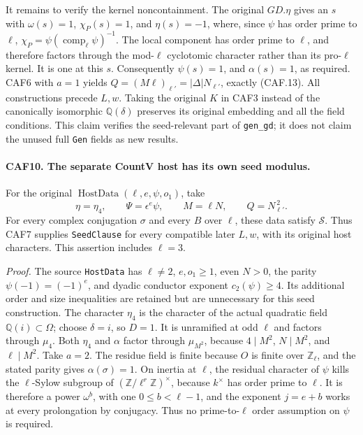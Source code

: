 It remains to verify the kernel noncontainment.  The original
\(GD.\eta\) gives an \(s\) with \(\omega(s)=1\),
\(\chi_P(s)=1\), and \(\eta(s)=-1\), where, since \(\psi\)
has order prime to \(\ell\),
\(\chi_P=\psi(\operatorname{comp}_\ell\psi)^{-1}\).
The local component has order prime to \(\ell\), and therefore
factors through the mod-\(\ell\) cyclotomic character rather than
its pro-\(\ell\) kernel.  It is one at this \(s\).
Consequently \(\psi(s)=1\), and \(\alpha(s)=1\), as required.
CAF6 with \(a=1\) yields
\(Q=(M\ell)_{\ell'}=|\Delta|N_{\ell'}\), exactly (CAF.13).
All constructions precede \(L,w\).  Taking the original \(K\)
in CAF3 instead of the canonically isomorphic \(\mathbb Q(\delta)\)
preserves its original embedding and all the field conditions.
This claim verifies the seed-relevant part of \texttt{gen\_gd}; it
does not claim the unused full \texttt{Gen} fields as new results.

\paragraph{CAF10. The separate CountV host has its own seed modulus.}
\label{claim:CAF10}
For the original \(\operatorname{HostData}(\ell,e,\psi,o_1)\),
take
\[
 \eta=\eta_4,\qquad \Psi=\epsilon^e\psi,
 \qquad M=\ell N,
 \qquad Q=N_{\ell'}^{\,2}.
 \tag{CAF.14}
\]
For every complex conjugation \(\sigma\) and every \(B\) over
\(\ell\), these data satisfy \(\mathcal S\).  Thus CAF7 supplies
\texttt{SeedClause} for every compatible later \(L,w\), with its
original host characters.  This assertion includes \(\ell=3\).

\emph{Proof.}
The source \texttt{HostData} has \(\ell\ne2\), \(e,o_1\ge1\),
even \(N>0\), the parity \(\psi(-1)=(-1)^e\), and dyadic
conductor exponent \(c_2(\psi)\ge4\).  Its additional order and
size inequalities are retained but are unnecessary for this seed
construction.  The character \(\eta_4\) is the character of the
actual quadratic field \(\mathbb Q(i)\subset\Omega\); choose
\(\delta=i\), so \(D=1\).  It is unramified at odd \(\ell\)
and factors through \(\mu_4\).
Both \(\eta_4\) and \(\alpha\) factor through
\(\mu_{M^2}\), because \(4\mid M^2\), \(N\mid M^2\), and
\(\ell\mid M^2\).  Take \(a=2\).
The residue field is finite because \(O\) is finite over
\(\mathbb Z_\ell\), and the stated parity gives
\(\alpha(\sigma)=1\).  On inertia at \(\ell\), the residual
character of \(\psi\) kills the \(\ell\)-Sylow subgroup of
\((\mathbb Z/\ell^r\mathbb Z)^\times\), because \(k^\times\)
has order prime to \(\ell\).  It is therefore a power
\(\omega^b\), with one \(0\le b<\ell-1\), and the exponent
\(j=e+b\) works at every prolongation by conjugacy.  Thus no
prime-to-\(\ell\) order assumption on \(\psi\) is required.

